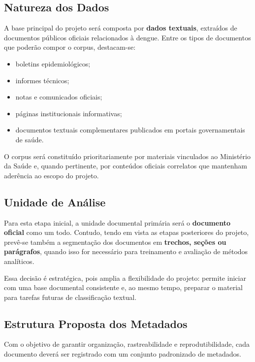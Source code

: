 \documentclass[12pt,a4paper]{article}
\begin{document}
\subsection{Natureza dos Dados}

A base principal do projeto será composta por \textbf{dados textuais}, extraídos de documentos públicos oficiais relacionados à dengue. Entre os tipos de documentos que poderão compor o corpus, destacam-se:

\begin{itemize}[leftmargin=1.2cm]
    \item boletins epidemiológicos;
    \item informes técnicos;
    \item notas e comunicados oficiais;
    \item páginas institucionais informativas;
    \item documentos textuais complementares publicados em portais governamentais de saúde.
\end{itemize}

O corpus será constituído prioritariamente por materiais vinculados ao Ministério da Saúde e, quando pertinente, por conteúdos oficiais correlatos que mantenham aderência ao escopo do projeto.

\subsection{Unidade de Análise}

Para esta etapa inicial, a unidade documental primária será o \textbf{documento oficial} como um todo. Contudo, tendo em vista as etapas posteriores do projeto, prevê-se também a segmentação dos documentos em \textbf{trechos, seções ou parágrafos}, quando isso for necessário para treinamento e avaliação de métodos analíticos.

Essa decisão é estratégica, pois amplia a flexibilidade do projeto: permite iniciar com uma base documental consistente e, ao mesmo tempo, preparar o material para tarefas futuras de classificação textual.

\subsection{Estrutura Proposta dos Metadados}

Com o objetivo de garantir organização, rastreabilidade e reprodutibilidade, cada documento deverá ser registrado com um conjunto padronizado de metadados.
\end{document}
